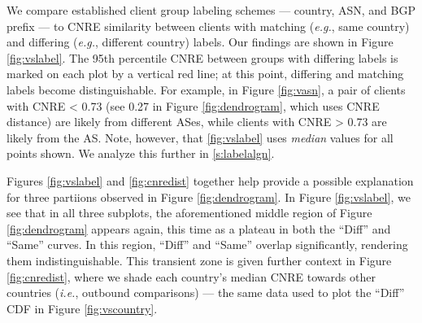
We compare established client group labeling schemes  ---
country, ASN, and BGP prefix --- to CNRE similarity between clients with
matching (\emph{e.g.}, same country) and differing (\emph{e.g.}, different
country) labels. Our findings are shown in Figure \ref{fig:vslabel}. The 95th percentile CNRE between groups with differing labels
is marked on each plot by a vertical red line; at this point,
differing and matching labels become distinguishable. For example, in Figure
\ref{fig:vasn}, a pair of clients with CNRE < 0.73 (see 0.27 in
Figure \ref{fig:dendrogram}, which uses CNRE distance) are likely from different
ASes, while clients with CNRE > 0.73 are likely from the AS. Note, however, that
\ref{fig:vslabel} uses \emph{median} values for all points shown. We analyze
this further in \ref{s:labelalgn}. 


Figures \ref{fig:vslabel} and \ref{fig:cnredist} together help provide a possible
explanation for three partiions observed in Figure \ref{fig:dendrogram}. In
Figure \ref{fig:vslabel}, we see that in all three subplots, the aforementioned
middle region of Figure \ref{fig:dendrogram} appears again, this time as a
plateau in both the ``Diff'' and ``Same'' curves. In this region, ``Diff'' and
``Same'' overlap significantly, rendering them indistinguishable. This transient
zone is given further context in Figure \ref{fig:cnredist}, where we shade each
country's median CNRE towards other countries (\emph{i.e.}, outbound
comparisons) --- the same data used to plot the
``Diff'' CDF in Figure \ref{fig:vscountry}. 

